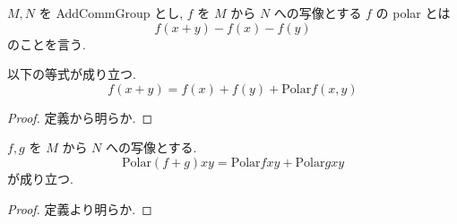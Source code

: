 %

\begin{definition}
  \(M,N\) を AddCommGroup とし, \(f\) を \(M\) から \(N\) への写像とする
  \(f\) の polar とは
  \[
  f(x+y) - f(x) - f(y)
  \]
  のことを言う.
\end{definition}

\begin{theorem}
  以下の等式が成り立つ.
$$
  f(x + y) = f(x) + f(y) + \mathrm{Polar} f(x,y)
$$
\end{theorem}

\begin{proof}
  定義から明らか.
\end{proof}

\begin{theorem}
  \(f,g\) を \(M\) から \(N\) への写像とする.
  \[
  \mathrm{Polar}(f + g) x y = \mathrm{Polar} f x y + \mathrm{Polar} g x y
  \]
  が成り立つ.
\end{theorem}

\begin{proof}
  定義より明らか.
\end{proof}
